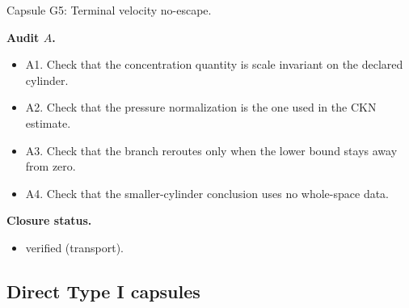 \documentclass[11pt]{amsart}
\newcommand{\capsulefield}[1]{\par\smallskip\noindent\textbf{#1.}\ }
\begin{document}
\begin{proofcapsule}{Capsule G5: Terminal velocity no-escape.}
  \capsulefield{Audit \(A\)}
  \begin{itemize}[leftmargin=1.8em]
  \item A1. Check that the concentration quantity is scale invariant on the declared cylinder.
  \item A2. Check that the pressure normalization is the one used in the CKN estimate.
  \item A3. Check that the branch reroutes only when the lower bound stays away from zero.
  \item A4. Check that the smaller-cylinder conclusion uses no whole-space data.
  \end{itemize}
  \capsulefield{Closure status}
  \begin{itemize}[leftmargin=1.8em]
  \item verified (transport).
  \end{itemize}
\end{proofcapsule}

\subsection{Direct Type I capsules}
\end{document}
